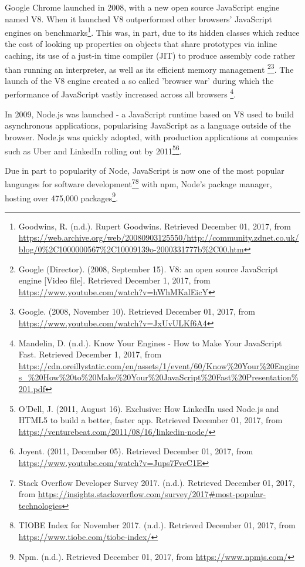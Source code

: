 \documentclass[]{article}
\begin{document}
Google Chrome launched in 2008, with a new open source JavaScript engine
named V8. When it launched V8 outperformed other browsers' JavaScript
engines on benchmarks\footnote{Goodwins, R. (n.d.). Rupert Goodwins.
  Retrieved December 01, 2017, from
  \url{https://web.archive.org/web/20080903125550/http://community.zdnet.co.uk/blog/0\%2C1000000567\%2C10009139o-2000331777b\%2C00.htm}}.
This was, in part, due to its hidden classes which reduce the cost of
looking up properties on objects that share prototypes via inline
caching, its use of a just-in time compiler (JIT) to produce assembly
code rather than running an interpreter, as well as its efficient memory
management \footnote{Google (Director). (2008, September 15). V8: an
  open source JavaScript engine {[}Video file{]}. Retrieved December 1,
  2017, from \url{https://www.youtube.com/watch?v=hWhMKalEicY}}\footnote{Google.
  (2008, November 10). Retrieved December 01, 2017, from
  \url{https://www.youtube.com/watch?v=JxUvULKf6A4}}. The launch of the
V8 engine created a so called 'browser war' during which the performance
of JavaScript vastly increased across all browsers \footnote{Mandelin,
  D. (n.d.). Know Your Engines - How to Make Your JavaScript Fast.
  Retrieved December 1, 2017, from
  \url{https://cdn.oreillystatic.com/en/assets/1/event/60/Know\%20Your\%20Engines_\%20How\%20to\%20Make\%20Your\%20JavaScript\%20Fast\%20Presentation\%201.pdf}}.

In 2009, Node.js was launched - a JavaScript runtime based on V8 used to
build asynchronous applications, popularising JavaScript as a language
outside of the browser. Node.js was quickly adopted, with production
applications at companies such as Uber and LinkedIn rolling out by
2011\footnote{O'Dell, J. (2011, August 16). Exclusive: How LinkedIn used
  Node.js and HTML5 to build a better, faster app. Retrieved December
  01, 2017, from \url{https://venturebeat.com/2011/08/16/linkedin-node/}}\footnote{Joyent.
  (2011, December 05). Retrieved December 01, 2017, from
  \url{https://www.youtube.com/watch?v=Jups7FveC1E}}.

Due in part to popularity of Node, JavaScript is now one of the most
popular languages for software development\footnote{Stack Overflow
  Developer Survey 2017. (n.d.). Retrieved December 01, 2017, from
  \url{https://insights.stackoverflow.com/survey/2017\#most-popular-technologies}}\footnote{TIOBE
  Index for November 2017. (n.d.). Retrieved December 01, 2017, from
  \url{https://www.tiobe.com/tiobe-index/}} with npm, Node's package
manager, hosting over 475,000 packages\footnote{Npm. (n.d.). Retrieved
  December 01, 2017, from \url{https://www.npmjs.com/}}.
\end{document}
